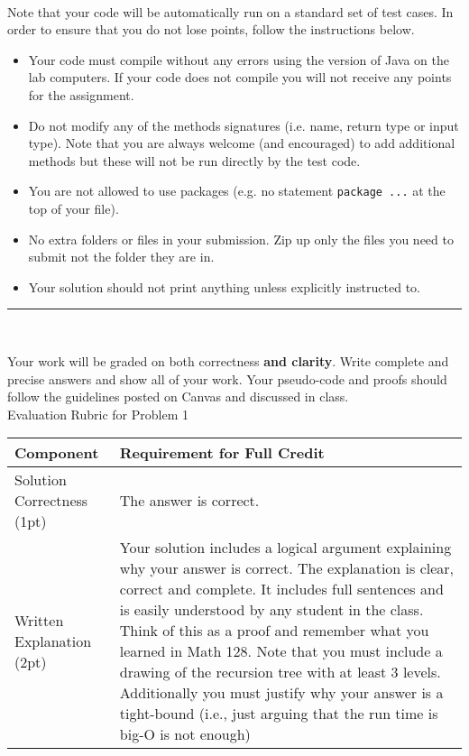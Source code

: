 \documentclass[11pt,answers]{exam}
\begin{document}
\\ 

\noindent Note that your code will be automatically run on a standard set of test cases.  In order to ensure that you do not lose points, follow the instructions below.
\begin{itemize}
\item Your code must compile without any errors using the version of Java on the lab computers.  If your code does not compile you will not receive any points for the assignment.
\item Do not modify any of the methods signatures (i.e. name, return type or input type).  Note that you are always welcome (and encouraged) to add additional methods but these will not be run directly by the test code.
\item You are not allowed to use packages (e.g. no statement \texttt{package ...} at the top of your file).
\item No extra folders or files in your submission.  Zip up only the files you need to submit not the folder they are in.
\item Your solution should not print anything unless explicitly instructed to.
\end{itemize}
      \hrule
\vspace{2em}
\\

\vspace{.5em}

\noindent Your work will be graded on both correctness {\bf and clarity}.  Write complete and precise answers and show all of your work.  Your pseudo-code and proofs should follow the guidelines posted on Canvas and discussed in class.    \\

Evaluation Rubric for Problem 1\\
\begin{center}
  \begin{tabular}{| p{7cm} | p{10cm} |}
	\hline
	Component & Requirement for Full Credit\\
    \hline
    Solution Correctness  (1pt) & The answer is correct. \\ \hline
  Written Explanation  (2pt) & Your solution includes a logical argument explaining why your answer is correct. The explanation is clear, correct and complete.   It includes full sentences and is easily understood by any student in the class. Think of this as a proof and remember what you learned in Math 128. Note that you must include a drawing of the recursion tree with at least 3 levels.  Additionally you must justify why your answer is a tight-bound (i.e., just arguing that the run time is big-O is not enough)\\ \hline
  \end{tabular}
\end{center} 
\end{document}

